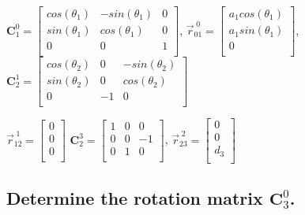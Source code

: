 \documentclass[12pt,letterpaper, onecolumn]{exam}
\begin{document}
\begin{questions}
{        \centering
        $\mathbf{C}_1^0 =
            \begin{bmatrix}
                cos(\theta_1) & -sin(\theta_1) & 0 \\
                sin(\theta_1) & cos(\theta_1)  & 0 \\
                0             & 0              & 1 \\
            \end{bmatrix}
        $,
        $\vec{r}^{\;0}_{01} =
            \begin{bmatrix}
                a_1cos(\theta_1) \\
                a_1sin(\theta_1) \\
                0                \\
            \end{bmatrix}
        $,
        $\mathbf{C}_2^1 =
            \begin{bmatrix}
                cos(\theta_2) & 0  & -sin(\theta_2) \\
                sin(\theta_2) & 0  & cos(\theta_2)  \\
                0             & -1 & 0              \\
            \end{bmatrix}
        $

        \qquad \qquad \qquad \qquad \quad
        $\vec{r}^{\;1}_{12} =
            \begin{bmatrix}
                0 \\
                0 \\
                0 \\
            \end{bmatrix}$
        $\mathbf{C}_2^3 =
            \begin{bmatrix}
                1 & 0 & 0  \\
                0 & 0 & -1 \\
                0 & 1 & 0  \\
            \end{bmatrix}
        $,\quad
        $\vec{r}^{\;2}_{23} =
            \begin{bmatrix}
                0   \\
                0   \\
                d_3 \\
            \end{bmatrix}
        $
    }
    \begin{parts}
        \part{Determine the rotation matrix $\mathbf{C}_3^0$.}


\end{parts}
\end{questions}
\end{document}
